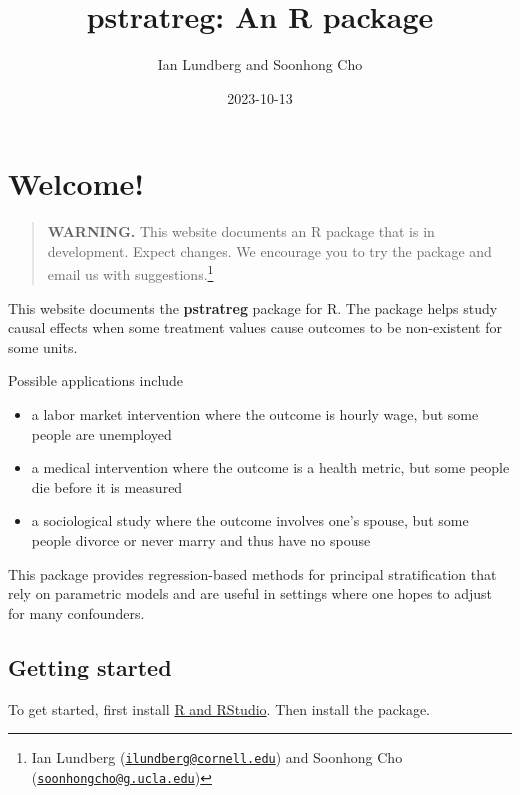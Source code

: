 \documentclass[
]{book}
\title{pstratreg: An R package}
\author{Ian Lundberg and Soonhong Cho}
\date{2023-10-13}
\providecommand{\tightlist}{%
  \setlength{\itemsep}{0pt}\setlength{\parskip}{0pt}}
\begin{document}
\maketitle

{
\setcounter{tocdepth}{1}
\tableofcontents
}
\hypertarget{welcome}{%
\chapter*{Welcome!}\label{welcome}}

\begin{quote}
\textbf{WARNING.} This website documents an R package that is in development. Expect changes. We encourage you to try the package and email us with suggestions.\footnote{Ian Lundberg (\href{mailto:ilundberg@cornell.edu}{\nolinkurl{ilundberg@cornell.edu}}) and Soonhong Cho (\href{mailto:soonhongcho@g.ucla.edu}{\nolinkurl{soonhongcho@g.ucla.edu}})}
\end{quote}

This website documents the \textbf{pstratreg} package for R. The package helps study causal effects when some treatment values cause outcomes to be non-existent for some units.

Possible applications include

\begin{itemize}
\tightlist
\item
  a labor market intervention where the outcome is hourly wage, but some people are unemployed
\item
  a medical intervention where the outcome is a health metric, but some people die before it is measured
\item
  a sociological study where the outcome involves one's spouse, but some people divorce or never marry and thus have no spouse
\end{itemize}

This package provides regression-based methods for principal stratification that rely on parametric models and are useful in settings where one hopes to adjust for many confounders.

\hypertarget{getting-started}{%
\section*{Getting started}\label{getting-started}}

To get started, first install \href{https://rstudio-education.github.io/hopr/starting.html}{R and RStudio}. Then install the package.
\end{document}
